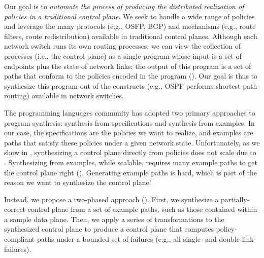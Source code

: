 Our goal is to {\em automate the process of producing the distributed
realization of policies in a traditional control plane}. We seek to handle
a wide range of policies and leverage the many protocols (e.g., OSFP, BGP) and
mechanisms (e.g., route filters, route redistribution) available in
traditional control planes. Although each network switch runs its own routing
processes, we can view the collection of processes (i.e., the control plane)
as a single program whose input is a set of endpoints plus the state
of network links; the output of this program is a set of paths that conform to
the policies encoded in the program (). Our goal is
thus to synthesize this program out of the constructs 
(e.g., OSPF performs shortest-path routing) available in network switches.


The programming languages community has adopted two primary approaches to
program synthesis: synthesis from specifications and synthesis from examples.
In our case, the specifications are the policies we want to realize, and
examples are paths that satisfy these policies under a given network state.
Unfortunately, as we show in , synthesizing a control plane
directly from policies does not scale due to .
Synthesizing from examples, while scalable, requires many example paths to get
the control plane right (). Generating example paths is hard,
which is part of the reason we want to synthesize the control plane!


Instead, we propose a two-phased approach (). First, we
synthesize a partially-correct control plane from a set of example paths, such
as those contained within a sample data plane. Then, we apply a series of
transformations to the synthesized control plane to produce a control plane
that computes policy-compliant paths under a bounded set of failures (e.g.,
all single- and double-link failures).

